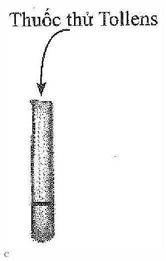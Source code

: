\documentclass[10pt]{article}
\begin{document}
\begin{figure}[h]
\begin{center}
  \includegraphics[width=\textwidth]{2025_10_23_fa9073eecee116ad8cf2g-81(3)}
\captionsetup{labelformat=empty}
\caption{C}
\end{center}
\end{figure}
\end{document}
